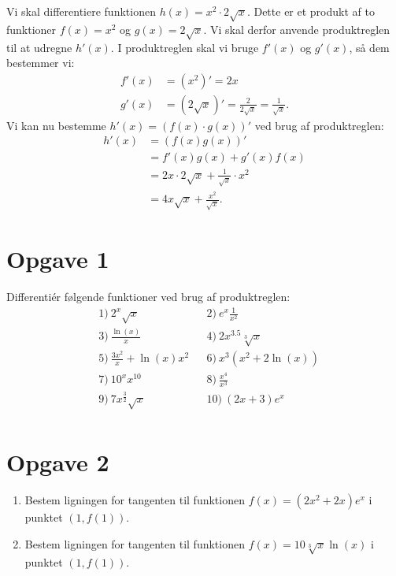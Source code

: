 \begin{exa}
Vi skal differentiere funktionen $h(x) = x^2\cdot 2\sqrt{x}$. Dette er et produkt af to funktioner
$f(x) = x^2$ og $g(x)= 2\sqrt{x}$. Vi skal derfor anvende produktreglen til at udregne $h'(x)$. I produktreglen skal vi bruge $f'(x)$ og $g'(x)$, så dem bestemmer vi:
\begin{align*}
f'(x) &= (x^2)' = 2x\\
g'(x) &= (2\sqrt{x})' = \frac{2}{2\sqrt{x}} = \frac{1}{\sqrt{x}}.
\end{align*} 
Vi kan nu bestemme $h'(x) = (f(x)\cdot g(x))'$ ved brug af produktreglen:
\begin{align*}
h'(x) &= (f(x)g(x))' \\
&= f'(x)g(x)+g'(x)f(x) \\
&= 2x\cdot 2\sqrt{x} + \frac{1}{\sqrt{x}}\cdot x^2\\
&= 4x\sqrt{x} + \frac{x^2}{\sqrt{x}}.
\end{align*}
\end{exa}

\section*{Opgave 1}
Differentiér følgende funktioner ved brug af produktreglen:
\begin{align*}
&1) \   2^x\sqrt{x}   &&2) \  e^x\frac{1}{x^2}     \\
&3) \  \frac{\ln(x)}{x}    &&4) \   2x^{3.5}\sqrt[3]{x}    \\
&5) \  \frac{3x^2}{x} + \ln(x)x^2    &&6) \ x^3(x^2+2\ln(x))      \\
&7) \  10^xx^{10}    &&8) \  \frac{x^4}{x^3}     \\
&9) \   7x^{\frac{3}{2}}\sqrt{x}   &&10) \   (2x+3)e^x    \\
\end{align*}
\section*{Opgave 2}
\begin{enumerate}[label=\roman*)]
\item Bestem ligningen for tangenten til funktionen $f(x)=(2x^2+2x)e^x$ i punktet $(1,f(1))$.
\item Bestem ligningen for tangenten til funktionen $f(x) = 10\sqrt[3]{x}\ln(x)$ i punktet $(1,f(1))$.
\end{enumerate}